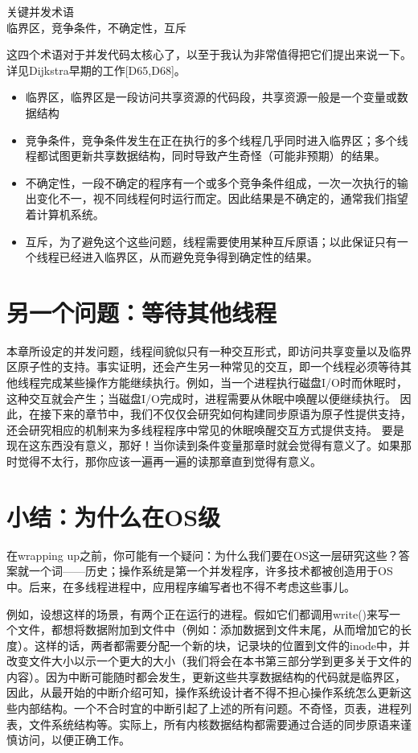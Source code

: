 \begin{tcolorbox}[colframe=grey,colback= grey,arc=0pt,left=6pt,right=6pt,top=6pt,bottom=6pt,boxsep=0pt]
\begin{center}
关键并发术语\\
临界区，竞争条件，不确定性，互斥
\end{center}
这四个术语对于并发代码太核心了，以至于我认为非常值得把它们提出来说一下。详见Dijkstra早期的工作[D65,D68]。
\begin{itemize}
\item 临界区，临界区是一段访问共享资源的代码段，共享资源一般是一个变量或数据结构
\item 竞争条件，竞争条件发生在正在执行的多个线程几乎同时进入临界区；多个线程都试图更新共享数据结构，同时导致产生奇怪（可能非预期）的结果。
\item 不确定性，一段不确定的程序有一个或多个竞争条件组成，一次一次执行的输出变化不一，视不同线程何时运行而定。因此结果是不确定的，通常我们指望着计算机系统。
\item 互斥，为了避免这个这些问题，线程需要使用某种互斥原语；以此保证只有一个线程已经进入临界区，从而避免竞争得到确定性的结果。
\end{itemize}
\end{tcolorbox}

\section{另一个问题：等待其他线程}
本章所设定的并发问题，线程间貌似只有一种交互形式，即访问共享变量以及临界区原子性的支持。事实证明，还会产生另一种常见的交互，即一个线程必须等待其他线程完成某些操作方能继续执行。例如，当一个进程执行磁盘I/O时而休眠时，这种交互就会产生；当磁盘I/O完成时，进程需要从休眠中唤醒以便继续执行。
因此，在接下来的章节中，我们不仅仅会研究如何构建同步原语为原子性提供支持，还会研究相应的机制来为多线程程序中常见的休眠唤醒交互方式提供支持。
要是现在这东西没有意义，那好！当你读到条件变量那章时就会觉得有意义了。如果那时觉得不太行，那你应该一遍再一遍的读那章直到觉得有意义。

\section{小结：为什么在OS级}
在wrapping up之前，你可能有一个疑问：为什么我们要在OS这一层研究这些？答案就一个词——历史；操作系统是第一个并发程序，许多技术都被创造用于OS中。后来，在多线程进程中，应用程序编写者也不得不考虑这些事儿。

例如，设想这样的场景，有两个正在运行的进程。假如它们都调用write()来写一个文件，都想将数据附加到文件中（例如：添加数据到文件末尾，从而增加它的长度）。这样的话，两者都需要分配一个新的块，记录块的位置到文件的inode中，并改变文件大小以示一个更大的大小（我们将会在本书第三部分学到更多关于文件的内容）。因为中断可能随时都会发生，更新这些共享数据结构的代码就是临界区，因此，从最开始的中断介绍可知，操作系统设计者不得不担心操作系统怎么更新这些内部结构。一个不合时宜的中断引起了上述的所有问题。不奇怪，页表，进程列表，文件系统结构等。实际上，所有内核数据结构都需要通过合适的同步原语来谨慎访问，以便正确工作。

